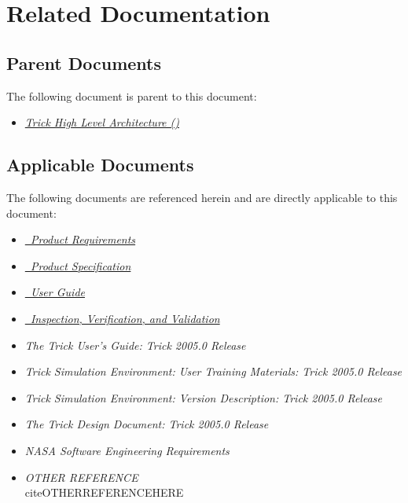 \documentclass[twoside,11pt,titlepage]{report}
\begin{document}
\chapter{Related Documentation}

\section{Parent Documents}

The following document is parent to this document:
\begin{itemize}
\item{\href{file:\TRICKHLAHOME/docs/TrickHLA.pdf}
           {\em Trick High Level Architecture (\TrickHLA)}}
\cite{trickhlaenv:TrickHLA}
\end{itemize}

\section{Applicable Documents}
The following documents are referenced herein and are directly
applicable to this document:

\begin{itemize}
\item{\href{file:MODELReqt.pdf}
           {\em \MODEL\ Product Requirements}}
\cite{trickhlaenv:MODELReqt}

\item{\href{file:MODELSpec.pdf}
           {\em \MODEL\ Product Specification}}
\cite{trickhlaenv:MODELSpec}

\item{\href{file:MODELUser.pdf}
           {\em \MODEL\ User Guide}}
\cite{trickhlaenv:MODELUser}

\item{\href{file:MODELIVV.pdf}
           {\em \MODEL\ Inspection, Verification, and Validation}}
\cite{trickhlaenv:MODELIVV}

\item{\em The Trick User's Guide: Trick 2005.0 Release}
\cite{Vetter:TrickUser}

\item{\em Trick Simulation Environment: User Training Materials:
          Trick 2005.0 Release}
\cite{Vetter:TrickUTM}

\item{\em Trick Simulation Environment: Version Description:
          Trick 2005.0 Release}
\cite{Vetter:TrickVD}

\item{\em The Trick Design Document: Trick 2005.0 Release}
\cite{Vetter:TrickDD}

\item{\em NASA Software Engineering Requirements}
\cite{NASA:SWE}

\item{\em OTHER REFERENCE} \\cite{OTHERREFERENCE}HERE
\end{itemize}
\end{document}
